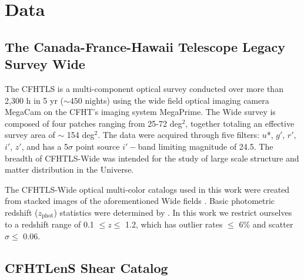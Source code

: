 
\section{Data}
\label{sec:data4}


\subsection{The Canada-France-Hawaii Telescope Legacy Survey Wide}

The \acf{CFHTLS} is a multi-component optical survey conducted over more than 2,300 h in 5 yr ($\sim450$ nights) using the wide field optical imaging camera MegaCam on the \ac{CFHT}'s imaging system MegaPrime. The Wide survey is composed of four patches ranging from 25-72 deg$^2$, together totaling an effective survey area of $\sim$ 154 deg$^2$. The data were acquired through five filters: $u$*, $g'$, $r'$, $i'$, $z'$, and has a 5$\sigma$ point source $i'-$band limiting magnitude of 24.5. The breadth of \ac{CFHTLS}-Wide was intended for the study of large scale structure and matter distribution in the Universe.

The \ac{CFHTLS}-Wide optical multi-color catalogs used in this work were created from stacked images of the aforementioned Wide fields \citep[see][for details on the data processing and multi-color catalog creation]{Erben09, Hildebrandt09a, Hildebrandt12, Erben13}. Basic photometric redshift ($z_{\mathrm{phot}}$) statistics were determined by \citet{Hildebrandt12}. In this work we restrict ourselves to a redshift range of 0.1 $\leq z \leq$ 1.2, which has outlier rates $\leq$ 6\% and scatter $\sigma \leq$ 0.06.


\subsection{\ac{CFHTLenS} Shear Catalog}

